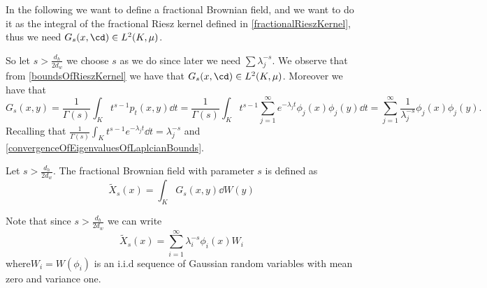 In the following we want to define a fractional Brownian field, and we want to do it as the integral of the fractional Riesz kernel defined in \cref{fractionalRieszKernel}, thus we need $G_s(x, \cd ) \in L^{2}(K, \mu)$. 

So let $s > \frac{d_h}{2d_w}$ we choose $s$ as we do since later we need $\sum \lambda_j^{-s}$. We observe that from \cref{boundsOfRieszKernel} we have that $G_s(x, \cd ) \in L^{2}(K, \mu)$. Moreover we have that
	\begin{equation}
		G_s(x,y) = \frac{1}{\Gamma(s)}\int_{K} t^{s-1}p_t(x,y)\dd t = \frac{1}{\Gamma(s)}\int_{K} t^{s-1}\sum_{j = 1}^{\infty} e^{-\lambda_j t} \phi_j(x)\phi_j(y)\dd t = \sum_{j = 1}^{\infty} \frac{1}{\lambda_j^{-s}} \phi_j(x)\phi_j(y).
	\end{equation}
	Recalling that $\frac{1}{\Gamma(s)}\int_{K} t^{s-1} e^{-\lambda_jt} \dd t = \lambda_j^{-s}$ and \cref{convergenceOfEigenvaluesOfLaplcianBounds}.

\begin{defi}
	Let $s > \frac{d_h}{2d_w}$. The fractional Brownian field with parameter $s$ is defined as 
	\begin{equation}
		\widetilde{X}_s(x) = \int_{K} G_s(x,y)\dd W (y)
	\end{equation}
\end{defi}

Note that since $s > \frac{d_h}{2d_w}$ we can write
\begin{equation}
	\widetilde{X}_s(x) = \sum_{i = 1}^{\infty} \lambda_i^{-s}\phi_i(x)W_i
\end{equation}
where$W_i = W(\phi_i)$ is an i.i.d sequence of Gaussian random variables with mean zero and variance one.

